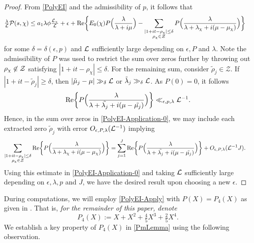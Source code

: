 \documentclass[12pt,psamsfonts]{amsart}
\theoremstyle{definition}
\theoremstyle{remark}
\numberwithin{equation}{section}
\begin{document}
\begin{proof} From \cref{PolyEI} and the admissibility of $p$, it follows that
\begin{equation}
\begin{aligned}
\tfrac{\lambda}{\mathcal{L}} \mathcal{P}(s, \chi)
& \leq a_1 \lambda \phi  \tfrac{\mathcal{L}_{\chi}}{\mathcal{L}} + \epsilon + \mathrm{Re}\bigg\{ E_0(\chi) P\Big( \frac{\lambda}{\lambda + i\mu}\Big)  -  \sum_{\substack{ |1+it-\rho_{\chi}| \leq \delta \\ \rho_{\chi} \in \mathcal{Z}}} P\Big( \frac{\lambda}{\lambda + \lambda_{\chi} + i(\mu - \mu_{\chi} ) } \Big)   \bigg\}  
\end{aligned}
\label{PolyEI-Application-0}
\end{equation}
for some $\delta = \delta(\epsilon,p)$ and $\mathcal{L}$ sufficiently large depending on $\epsilon, P$ and $\lambda$.  Note the admissibility of $P$ was used to restrict the sum over zeros further by throwing out $\rho_{\chi} \not\in \mathcal{Z}$ satisfying $|1+it-\rho_{\chi}| \leq \delta$.  For the remaining sum, consider $\tilde{\rho}_j \in \mathcal{Z}$. If $|1+it-\tilde{\rho}_j| \geq \delta$, then $|\tilde{\mu}_j-\mu| \gg_{\delta} \mathcal{L}$  or $\tilde{\lambda}_j \gg_{\delta} \mathcal{L}$. As $P(0) = 0$, it follows 
\[
 \mathrm{Re}\bigg\{ P\Big( \frac{\lambda}{\lambda + \tilde{\lambda_j} + i(\mu - \tilde{\mu_j} ) } \Big) \bigg\} \ll_{\epsilon, p, \lambda} \mathcal{L}^{-1}.
\]
Hence, in the sum over zeros in \eqref{PolyEI-Application-0}, we may include each extracted zero $\tilde{\rho}_j$ with error $O_{\epsilon,P,\lambda}(\mathcal{L}^{-1})$ implying
\begin{equation*}
\begin{aligned}
\sum_{ \substack{ |1+it-\rho_{\chi}| \leq \delta \\ \rho_{\chi} \in \mathcal{Z}} } \mathrm{Re}\bigg\{ P\Big( \frac{\lambda}{\lambda + \lambda_{\chi} + i(\mu - \mu_{\chi} ) } \Big) \bigg\} 
& = \sum_{j=1}^J  \mathrm{Re}\bigg\{ P\Big( \frac{\lambda}{\lambda + \tilde{\lambda_j} + i(\mu - \tilde{\mu_j}) } \Big) \bigg\} + O_{\epsilon, P, \lambda}(\mathcal{L}^{-1} J).
\end{aligned}
 \label{PolyEI-Application-1}
\end{equation*}
Using this estimate in \eqref{PolyEI-Application-0} and taking $\mathcal{L}$ sufficiently large depending on $\epsilon, \lambda, p$ and $J$, we have the desired result upon choosing a new $\epsilon$. 
\end{proof}

During computations, we will employ \cref{PolyEI-Apply} with $P(X) = P_4(X)$ as given in \cite{HBLinnik}. That is, \textit{for the remainder of this paper, denote}
\begin{equation}
P_4(X) := X + X^2 + \tfrac{4}{5}X^3 + \tfrac{2}{5}X^4.
\label{def:P_4}
\end{equation}
We establish a key property of $P_4(X)$ in \cref{PmLemma} using the following observation. 
\end{document}
